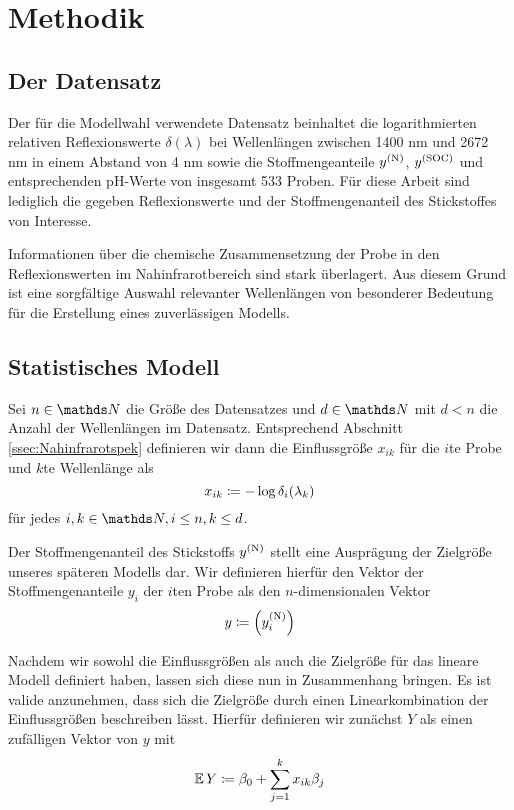 \section{Methodik}
\label{sec:Methodik}

	\subsection{Der Datensatz}
	\label{ssec:Datensatz}

	    Der für die Modellwahl verwendete Datensatz beinhaltet die logarithmierten relativen Reflexionswerte $\delta(\lambda)$ bei Wellenlängen zwischen 1400 nm und 2672 nm in einem Abstand von 4 nm sowie die Stoffmengeanteile $y^{\mathrm{(N)}}$, $y^{\mathrm{(SOC)}}$ und entsprechenden pH-Werte von insgesamt 533 Proben.
	    Für diese Arbeit sind lediglich die gegeben Reflexionswerte und der Stoffmengenanteil des Stickstoffes von Interesse.

	    Informationen über die chemische Zusammensetzung der Probe in den Reflexionswerten im Nahinfrarotbereich sind stark überlagert.\cite{Agelet2010}
	    Aus diesem Grund ist eine sorgfältige Auswahl relevanter Wellenlängen von besonderer Bedeutung für die Erstellung eines zuverlässigen Modells.



	\subsection{Statistisches Modell}
	\label{ssec:Statistisches Modell}

	    Sei $n\in\SN$ die Größe des Datensatzes und $d\in\SN$ mit $d< n$ die Anzahl der Wellenlängen im Datensatz.
	    Entsprechend Abschnitt \ref{ssec:Nahinfrarotspek} definieren wir dann die Einflussgröße $x_{ik}$ für die $i$te Probe und $k$te Wellenlänge als
	    \[
			x_{ik} \coloneqq -\log \delta_i(\lambda_k)
		\]
		für jedes $i,k\in\SN,i\leq n,k\leq d$.

	    Der Stoffmengenanteil des Stickstoffs  $y^{\mathrm{(N)}}$ stellt eine Ausprägung der Zielgröße unseres späteren Modells dar.
	    Wir definieren hierfür den Vektor der Stoffmengenanteile $y_i$ der $i$ten Probe als den $n$-dimensionalen Vektor
		\[
			 y \coloneqq \left( y^{\mathrm{(N)}}_i \right)
		\]

        Nachdem wir sowohl die Einflussgrößen als auch die Zielgröße für das lineare Modell definiert haben, lassen sich diese nun in Zusammenhang bringen.
        Es ist valide anzunehmen, dass sich die Zielgröße durch einen Linearkombination der Einflussgrößen beschreiben lässt.
        Hierfür definieren wir zunächst $Y$ als einen zufälligen Vektor von $y$ mit
        \[
			 \operatorname{\mathbb{E}} Y \coloneqq \beta_0 + \sum_{j=1}^k{x_{ik}\beta_j}
		\]

